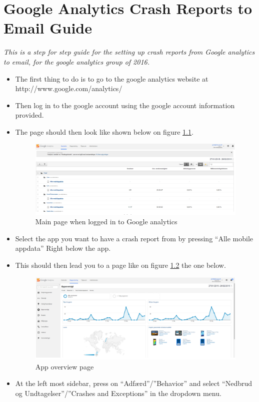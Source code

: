 \chapter{Google Analytics Crash Reports to Email Guide} \label{ChapCrashReport}
\textit{This is a step for step guide for the setting up crash reports from Google analytics to email, for the google analytics group of 2016.}

\begin{itemize}
	\item The first thing to do is to go to the google analytics website at http://www.google.com/analytics/ 
	\item Then log in to the google account using the google account information provided.
	\item The page should then look like shown below on figure \ref{MainPage}.
		\begin{figure}[H]
			\includegraphics[width=0.8 \textwidth]{pictures/MainPage.png}
			\caption{Main page when logged in to Google analytics}
			\label{MainPage}
		\end{figure}
	\item Select the app you want to have a crash report from by pressing “Alle mobile appdata” Right below the app.
	\item This should then lead you to a page like on figure \ref{Appoversigt} the one below.
		\begin{figure}[H]
			\includegraphics[width=0.8 \textwidth]{pictures/Appoversigt.png}
			\caption{App overview page}
			\label{Appoversigt}
		\end{figure}
	\item At the left most sidebar, press on “Adfærd”/”Behavior” and select “Nedbrud og Undtagelser”/”Crashes and Exceptions” in the dropdown menu.

\end{itemize}
